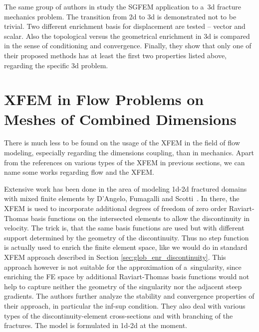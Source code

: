 The same group of authors in \cite{gupta_3d_fracture_2015} study the SGFEM application to a~3d fracture mechanics problem.
The transition from 2d to 3d is demonstrated not to be trivial. Two different enrichment basis for displacement are tested -- vector and scalar.
Also the topological versus the geometrical enrichment in 3d is compared in the sense of conditioning and convergence.
Finally, they show that only one of their proposed methods has at least the first two properties listed above,
regarding the specific 3d problem.




\section{XFEM in Flow Problems on Meshes of Combined Dimensions} \label{sec:soa_xfem_combined}


There is much less to be found on the usage of the XFEM in the field of flow modeling, especially regarding the dimensions coupling,
than in mechanics.
Apart from the references on various types of the XFEM in previous sections, we can name some works regarding flow and the XFEM.

Extensive work has been done in the area of modeling 1d-2d fractured domains with mixed finite 
elements by D'Angelo, Fumagalli and Scotti~\cite{fumagalli_numerical_2012, dangelo_mixed_2012, fumagalli_efficient_2014}. 
In there, the XFEM is used to incorporate additional degrees of freedom of zero order Raviart-Thomas basis 
functions on the intersected elements to allow the discontinuity in velocity.
The trick is, that the same basis functions are used but with different support determined by the geometry of the discontinuity.
Thus no step function is actually used to enrich the finite element space,
like we would do in standard XFEM approach described in Section \ref{sec:glob_enr_discontinuity}.
This approach however is not suitable for the approximation of a~singularity,
since enriching the FE space by additional Raviart-Thomas basis functions would not help to capture neither the geometry of the singularity
nor the adjacent steep gradients.
The authors further analyze the stability and convergence properties of their approach, in particular the inf-sup condition.
They also deal with various types of the discontinuity-element cross-sections and with branching of the fractures.
The model is formulated in 1d-2d at the moment.

